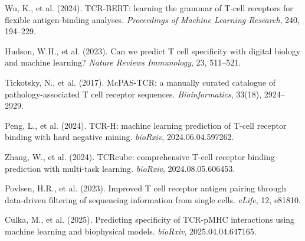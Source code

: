\documentclass[11pt, a4paper]{article}
\begin{document}
\begin{enumerate}[label={[\arabic*]}, noitemsep, leftmargin=*]
\item Wu, K., et al. (2024). TCR-BERT: learning the grammar of T-cell receptors for flexible antigen-binding analyses. \textit{Proceedings of Machine Learning Research}, 240, 194--229.
\item Hudson, W.H., et al. (2023). Can we predict T cell specificity with digital biology and machine learning? \textit{Nature Reviews Immunology}, 23, 511--521.
\item Tickotsky, N., et al. (2017). McPAS-TCR: a manually curated catalogue of pathology-associated T cell receptor sequences. \textit{Bioinformatics}, 33(18), 2924--2929.
\item Peng, L., et al. (2024). TCR-H: machine learning prediction of T-cell receptor binding with hard negative mining. \textit{bioRxiv}, 2024.06.04.597262.
\item Zhang, W., et al. (2024). TCRcube: comprehensive T-cell receptor binding prediction with multi-task learning. \textit{bioRxiv}, 2024.08.05.606453.
\item Povlsen, H.R., et al. (2023). Improved T cell receptor antigen pairing through data-driven filtering of sequencing information from single cells. \textit{eLife}, 12, e81810.
\item Culka, M., et al. (2025). Predicting specificity of TCR-pMHC interactions using machine learning and biophysical models. \textit{bioRxiv}, 2025.04.04.647165.
\end{enumerate}
\end{document}
